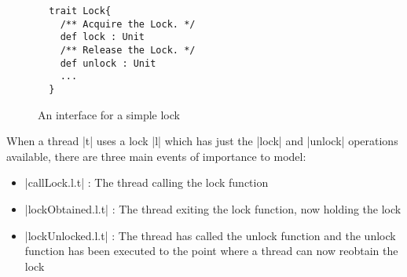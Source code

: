 \begin{figure}
\begin{lstlisting}
  trait Lock{
    /** Acquire the Lock. */
    def lock : Unit
    /** Release the Lock. */
    def unlock : Unit 
    ...
  }
\end{lstlisting}
\caption{An interface for a simple lock}
\label{code:LockInterface}
\end{figure}

When a thread |t| uses a lock |l| which has just the |lock| and |unlock| operations available, there are three main events of importance to model:

\begin{itemize}
  \item |callLock.l.t| : The thread calling the lock function
  \item |lockObtained.l.t| : The thread exiting the lock function, now holding the lock
  \item |lockUnlocked.l.t| : The thread has called the unlock function and the unlock function has been executed to the point where a thread can now reobtain the lock
\end{itemize}


